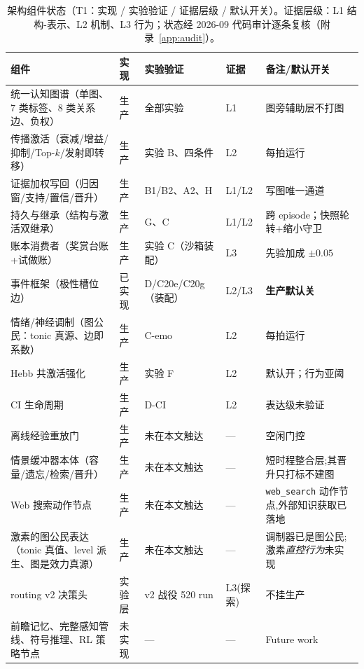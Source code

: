 \documentclass[10pt,a4paper]{ctexart}
\begin{document}
\begin{table}[t]
\centering\small
\caption{架构组件状态（T1：实现 / 实验验证 / 证据层级 / 默认开关）。证据层级：L1 结构-表示、L2 机制、L3 行为；状态经 2026-09 代码审计逐条复核（附录~\ref{app:audit}）。}
\label{tab:components}
\begin{tabular}{L{3.4cm}L{1.9cm}L{1.9cm}L{1.4cm}L{3.9cm}}
\toprule
\textbf{组件} & \textbf{实现} & \textbf{实验验证} & \textbf{证据} & \textbf{备注/默认开关} \\
\midrule
统一认知图谱（单图、7 类标签、8 类关系边、负权） & 生产 & 全部实验 & L1 & 图旁辅助层不打图 \\
传播激活（衰减/增益/抑制/Top-$k$/发射即转移） & 生产 & 实验 B、四条件 & L2 & 每拍运行 \\
证据加权写回（归因窗/支持/置信/晋升） & 生产 & B1/B2、A2、H & L1/L2 & 写图唯一通道 \\
持久与继承（结构与激活双继承） & 生产 & G、C & L1/L2 & 跨 episode；快照轮转+缩小守卫 \\
账本消费者（奖赏台账+试做账） & 生产 & 实验 C（沙箱装配） & L3 & 先验加成 $\pm0.05$ \\
事件框架（极性槽位边） & 已实现 & D/C20e/C20g（装配） & L2/L3 & \textbf{生产默认关} \\
情绪/神经调制（图公民：tonic 真源、边即系数） & 生产 & C-emo & L2 & 每拍运行 \\
Hebb 共激活强化 & 生产 & 实验 F & L2 & 默认开；行为亚阈 \\
CI 生命周期 & 生产 & D-CI & L2 & 表达级未验证 \\
离线经验重放门 & 生产 & 未在本文触达 & --- & 空闲门控 \\
情景缓冲器本体（容量/遗忘/检索/晋升） & 生产 & 未在本文触达 & --- & 短时程整合层;其晋升只打标不建图 \\
Web 搜索动作节点 & 生产 & 未在本文触达 & --- & \texttt{web\_search} 动作节点,外部知识获取已落地 \\
激素的图公民表达（tonic 真值、level 派生、图是效力真源） & 生产 & 未在本文触达 & --- & 调制器已是图公民;激素\emph{直控行为}未实现 \\
routing v2 决策头 & 实验层 & v2 战役 520 run & L3(探索) & 不挂生产 \\
前瞻记忆、完整感知管线、符号推理、RL 策略节点 & 未实现 & --- & --- & Future work \\
\bottomrule
\end{tabular}
\end{table}
\end{document}
